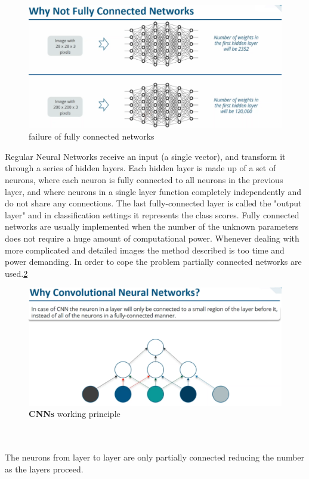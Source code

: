 \documentclass[11pt]{article}
\begin{document}
\begin{figure}[h]
\centering
\captionsetup{justification=centering}
\includegraphics[width=0.9\linewidth]{CNN2.pdf}
\caption{ failure of fully connected networks }
\label{fig:CNN2}
\end{figure}
\clearpage
 Regular Neural Networks receive an input (a single vector), and transform it through a series of hidden layers. Each hidden layer is made up of a set of neurons, where each neuron is fully connected to all neurons in the previous layer, and where neurons in a single layer function completely independently and do not share any connections. The last fully-connected layer is called the "output layer" and in classification settings it represents the class scores\cite{CNSU}.
Fully connected networks are usually  implemented when the number of the unknown parameters does not require a huge amount of computational power. Whenever dealing with more complicated and detailed images the method described is too time and power demanding. In order to cope the problem partially connected networks are used.\ref{fig:CNN3}
\begin{figure}[h]
\centering
\captionsetup{justification=centering}
\includegraphics[width=0.9\linewidth]{CNN3.pdf}
\caption{ \textbf{CNNs}  working principle }
\label{fig:CNN3}
\end{figure}
\\\\
The neurons from layer to layer are only partially connected reducing the number as the layers proceed.
\end{document}

